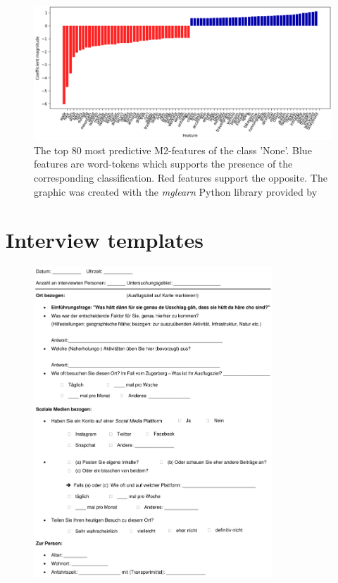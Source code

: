 \begin{figure}[h!]
   \centering
   \includegraphics[width=\textwidth]{img/m2_top40_features_None_cropped.pdf}
   \caption{The top 80 most predictive M2-features of the class 'None'. Blue features are word-tokens which supports the presence of the corresponding classification. Red features support the opposite. The graphic was created with the \textit{mglearn} Python library provided by \textcite{Guido2016}}
   \label{fig:M2_top40_features_None}
\end{figure}

\chapter{Interview templates} \label{interview_templates}

\begin{figure}[h!]
   \centering
   \includegraphics[width=0.8\textwidth]{code/interview_template_cropped.pdf}
   \label{fig:interview_template_appendix}
\end{figure}

